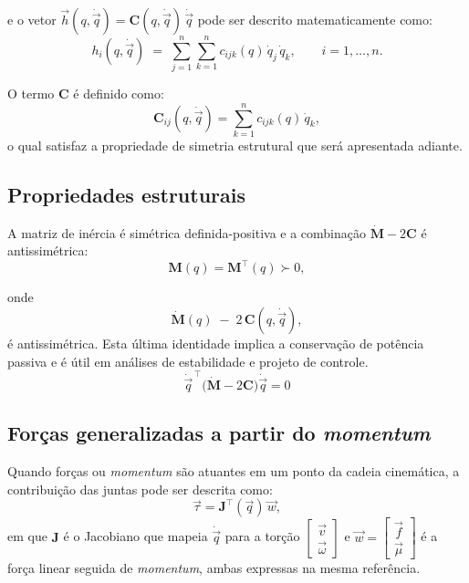 e o vetor $\vec h(q,\dot{\vec q})=\mathbf C(q,\dot{\vec q})\,\dot{\vec q}$
pode ser descrito matematicamente como:
\begin{equation}
h_i(q,\dot{\vec q}) \;=\; \sum_{j=1}^{n}\sum_{k=1}^{n} c_{ijk}(q)\,\dot q_j\,\dot q_k,
\qquad i=1,\dots,n.
\label{eq:h_def}
\end{equation}

O termo $\mathbf C$ é definido como:
\begin{equation}
\mathbf C_{ij}(q,\dot{\vec q})=
\sum_{k=1}^{n} c_{ijk}(q)\,\dot q_k,
\label{eq:C_def}
\end{equation}
o qual satisfaz a propriedade de simetria estrutural que será apresentada adiante.

\subsection{Propriedades estruturais}
\label{sec:propriedades_estruturais}
A matriz de inércia é simétrica definida-positiva e a combinação $\dot{\mathbf M}-2\mathbf C$ é antissimétrica:
\begin{equation}
\mathbf M(q)=\mathbf M^{\top}(q)\succ 0,
\label{eq:properties_M_C}
\end{equation}

onde 
\begin{equation}
    \dot{\mathbf M}(q)\;-\;2\,\mathbf C(q,\dot{\vec q}),
\end{equation}
é antissimétrica. Esta última identidade implica a conservação de potência passiva e é útil em análises de estabilidade e projeto de controle.
\begin{equation}
    \dot{\vec q}^{\,\top}\!\big(\dot{\mathbf M}-2\mathbf C\big)\dot{\vec q}=0
\end{equation}

\subsection{Forças generalizadas a partir do \emph{momentum}}
Quando forças ou \emph{momentum} são atuantes em um ponto da cadeia cinemática, a contribuição das juntas pode ser descrita como:
\begin{equation}
\vec \tau=
\mathbf J^{\top}(\vec q)\,\vec w,
\label{eq:tau_Jt_w}
\end{equation}
em que $\mathbf J$ é o Jacobiano que mapeia $\dot{\vec q}$ para a torção $\begin{bmatrix}\vec v\\ \vec \omega\end{bmatrix}$ e $\vec w=\begin{bmatrix}\vec f\\ \vec \mu\end{bmatrix}$ é a força linear seguida de \emph{momentum}, ambas expressas na mesma referência.


